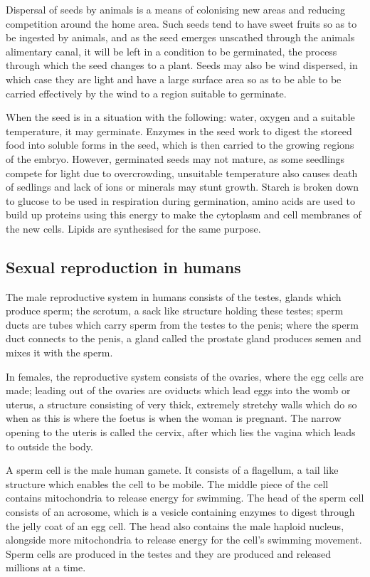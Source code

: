 Dispersal of seeds by animals is a means of colonising new areas and reducing competition around
the home area. Such seeds tend to have sweet fruits so as to be ingested by animals, and as the
seed emerges unscathed through the animals alimentary canal, it will be left in a condition
to be germinated, the process through which the seed changes to a plant. Seeds may also be wind
dispersed, in which case they are light and have a large surface area so as to be able to be carried
effectively by the wind to a region suitable to germinate.

When the seed is in a situation with the following: water, oxygen and a suitable temperature, it
may germinate. Enzymes in the seed work to digest the storeed food into soluble forms in the seed,
which is then carried to the growing regions of the embryo. However, germinated seeds may not 
mature, as some seedlings compete for light due to overcrowding, unsuitable temperature also causes
death of sedlings and lack of ions or minerals may stunt growth. Starch is broken down to glucose
to be used in respiration during germination, amino acids are used to build up proteins using this
energy to make the cytoplasm and cell membranes of the new cells. Lipids are synthesised for the
same purpose.

\subsection{Sexual reproduction in humans}

The male reproductive system in humans consists of the testes, glands which produce sperm; the 
scrotum, a sack like structure holding these testes; sperm ducts are tubes which
carry sperm from the testes to the penis; where the sperm duct connects to the penis, a gland
called the prostate gland produces semen and mixes it with the sperm.

In females, the reproductive system consists of the ovaries, where the egg cells are made; leading
out of the ovaries are oviducts which lead eggs into the womb or uterus, a structure consisting
of very thick, extremely stretchy walls which do so when as this is where the foetus is when the
woman is pregnant. The narrow opening to the uteris is called the cervix, after which lies the
vagina which leads to outside the body.

A sperm cell is the male human gamete. It consists of a flagellum, a tail like structure which
enables the cell to be mobile. The middle piece of the cell contains mitochondria to release
energy for swimming. The head of the sperm cell consists of an acrosome, which is a vesicle 
containing enzymes to digest through the jelly coat of an egg cell. The head also contains the
male haploid nucleus, alongside more mitochondria to release energy for the cell's swimming 
movement. Sperm cells are produced in the testes and they are produced and released millions
at a time.

